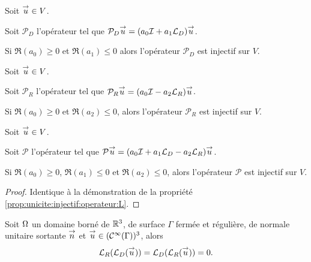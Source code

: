   \begin{prop}
    \label{prop:unicite:injectif:operateur:LD}
    Soit \({\overset{\rightarrow}{u}} \in V\).

    Soit \(\mathcal{P}_D\) l'opérateur tel que \(\mathcal{P}_D{\overset{\rightarrow}{u}} = (a_0{\mathcal{I}} + a_1 {\mathcal{L}_D}){\overset{\rightarrow}{u}}\).

    Si \(\Re(a_0)\ge 0\) et \(\Re(a_1)\le 0\) alors l'opérateur \(\mathcal{P}_D\) est injectif sur \(V\).
  \end{prop}
  \begin{prop}
    \label{prop:unicite:injectif:operateur:LR}
    Soit \({\overset{\rightarrow}{u}} \in V\).

    Soit \(\mathcal{P}_R\) l'opérateur tel que \(\mathcal{P}_R{\overset{\rightarrow}{u}} = (a_0{\mathcal{I}} - a_2 {\mathcal{L}_R}){\overset{\rightarrow}{u}}\).

    Si \(\Re(a_0)\ge 0\) et \(\Re(a_2)\le 0\), alors l'opérateur \(\mathcal{P}_R\) est injectif sur \(V\).
  \end{prop}
  \begin{prop}
    \label{prop:unicite:injectif:operateur:LD-LR}
    Soit \({\overset{\rightarrow}{u}} \in V\).
    
    Soit \(\mathcal{P}\) l'opérateur tel que \(\mathcal{P}{\overset{\rightarrow}{u}} = (a_0{\mathcal{I}} + a_1 {\mathcal{L}_D} - a_2{\mathcal{L}_R}){\overset{\rightarrow}{u}}\).

    Si \(\Re(a_0)\ge 0\), \(\Re(a_1)\le 0\) et \(\Re(a_2)\le 0\), alors l'opérateur \(\mathcal{P}\) est injectif sur \(V\).
  \end{prop}
  \begin{proof}
   Identique à la démonstration de la propriété \ref{prop:unicite:injectif:operateur:L}.
  \end{proof}

  \begin{prop}
    Soit \(\Omega\) un domaine borné de \(\mathbb R^3\), de surface \(\Gamma\) fermée et régulière, de normale unitaire sortante \({\overset{\rightarrow}{n}}\) et \({\overset{\rightarrow}{u}} \in (\mathcal{C}^\infty(\Gamma))^3\), alors
    \begin{equation*}
        {\mathcal{L}_R}({\mathcal{L}_D}({\overset{\rightarrow}{u}})) = {\mathcal{L}_D}({\mathcal{L}_R}({\overset{\rightarrow}{u}})) = 0.
    \end{equation*}
  \end{prop}

